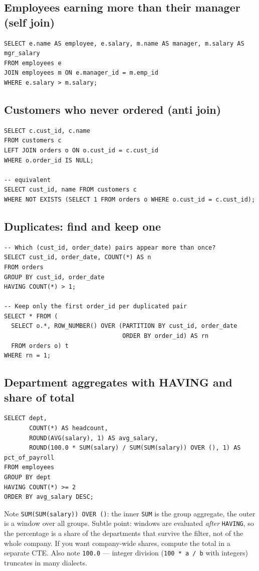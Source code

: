 \subsection{Employees earning more than their manager (self join)}
\begin{lstlisting}[style=sql]
SELECT e.name AS employee, e.salary, m.name AS manager, m.salary AS mgr_salary
FROM employees e
JOIN employees m ON e.manager_id = m.emp_id
WHERE e.salary > m.salary;
\end{lstlisting}

\subsection{Customers who never ordered (anti join)}
\begin{lstlisting}[style=sql]
SELECT c.cust_id, c.name
FROM customers c
LEFT JOIN orders o ON o.cust_id = c.cust_id
WHERE o.order_id IS NULL;

-- equivalent
SELECT cust_id, name FROM customers c
WHERE NOT EXISTS (SELECT 1 FROM orders o WHERE o.cust_id = c.cust_id);
\end{lstlisting}

\subsection{Duplicates: find and keep one}
\begin{lstlisting}[style=sql]
-- Which (cust_id, order_date) pairs appear more than once?
SELECT cust_id, order_date, COUNT(*) AS n
FROM orders
GROUP BY cust_id, order_date
HAVING COUNT(*) > 1;

-- Keep only the first order_id per duplicated pair
SELECT * FROM (
  SELECT o.*, ROW_NUMBER() OVER (PARTITION BY cust_id, order_date
                                 ORDER BY order_id) AS rn
  FROM orders o) t
WHERE rn = 1;
\end{lstlisting}

\subsection{Department aggregates with HAVING and share of total}
\begin{lstlisting}[style=sql]
SELECT dept,
       COUNT(*) AS headcount,
       ROUND(AVG(salary), 1) AS avg_salary,
       ROUND(100.0 * SUM(salary) / SUM(SUM(salary)) OVER (), 1) AS pct_of_payroll
FROM employees
GROUP BY dept
HAVING COUNT(*) >= 2
ORDER BY avg_salary DESC;
\end{lstlisting}
Note \texttt{SUM(SUM(salary)) OVER ()}: the inner \texttt{SUM} is the group aggregate, the outer is a window over all groups. Subtle point: windows are evaluated \emph{after} \texttt{HAVING}, so the percentage is a share of the departments that survive the filter, not of the whole company. If you want company-wide shares, compute the total in a separate CTE. Also note \texttt{100.0} --- integer division (\texttt{100 * a / b} with integers) truncates in many dialects.

